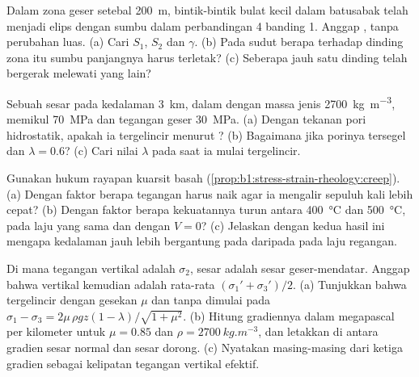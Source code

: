 \begin{exercise}[$\star\star$]\label{exo:b1:stress-strain-rheology:7}
Dalam zona geser setebal \qty{200}{m}, bintik-bintik bulat kecil dalam batusabak telah menjadi elips dengan sumbu dalam perbandingan 4 banding 1. Anggap , tanpa perubahan luas. (a) Cari $S_1$, $S_2$ dan $\gamma$. (b) Pada sudut berapa terhadap dinding zona itu sumbu panjangnya harus terletak? (c) Seberapa jauh satu dinding telah bergerak melewati yang lain?
\end{exercise}

\begin{exercise}[$\star\star$]\label{exo:b1:stress-strain-rheology:8}
Sebuah sesar pada kedalaman \qty{3}{km}, dalam  dengan massa jenis \qty{2700}{kg.m^{-3}}, memikul  \qty{70}{MPa} dan tegangan geser \qty{30}{MPa}. (a) Dengan tekanan pori hidrostatik, apakah ia tergelincir menurut ? (b) Bagaimana jika porinya tersegel dan $\lambda = 0.6$? (c) Cari nilai $\lambda$ pada saat ia mulai tergelincir.
\end{exercise}

\begin{exercise}[$\star\star$]\label{exo:b1:stress-strain-rheology:9}
Gunakan hukum rayapan kuarsit basah (\cref{prop:b1:stress-strain-rheology:creep}). (a) Dengan faktor berapa tegangan harus naik agar ia mengalir sepuluh kali lebih cepat? (b) Dengan faktor berapa kekuatannya turun antara \qty{400}{\degreeCelsius} dan \qty{500}{\degreeCelsius}, pada laju yang sama dan dengan $V = 0$? (c) Jelaskan dengan kedua hasil ini mengapa kedalaman  jauh lebih bergantung pada  daripada pada laju regangan.
\end{exercise}

\begin{exercise}[$\star\star\star$]\label{exo:b1:stress-strain-rheology:10}
Di mana tegangan vertikal adalah $\sigma_2$, sesar adalah sesar geser-mendatar. Anggap bahwa  vertikal kemudian adalah rata-rata $(\sigma_1' + \sigma_3')/2$. (a) Tunjukkan bahwa tergelincir dengan gesekan $\mu$ dan tanpa  dimulai pada $\sigma_1 - \sigma_3 = 2\mu\,\rho g z(1-\lambda)/\sqrt{1+\mu^2}$. (b) Hitung gradiennya dalam megapascal per kilometer untuk $\mu = 0.85$ dan $\rho = \qty{2700}{kg.m^{-3}}$, dan letakkan di antara gradien sesar normal dan sesar dorong. (c) Nyatakan masing-masing dari ketiga gradien sebagai kelipatan tegangan vertikal efektif.
\end{exercise}

